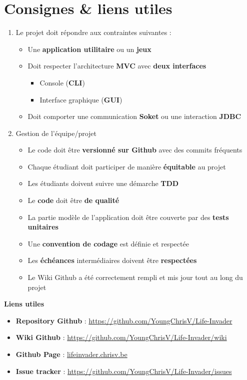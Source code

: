 \chapter*{Consignes \& liens utiles}
\label{chap:Consignes}

\begin{enumerate}[I]
    \item Le projet doit répondre aux contraintes suivantes :
    \begin{itemize}
        \item Une \textbf{application utilitaire} ou un \textbf{jeux}
        \item Doit respecter l'architecture \textbf{MVC} avec \textbf{deux interfaces}
        \begin{itemize}
            \item Console (\textbf{CLI})
            \item Interface graphique (\textbf{GUI})
        \end{itemize}
        \item Doit comporter une communication \textbf{Soket} ou une interaction \textbf{JDBC}
    \end{itemize}   
    \item Gestion de l'équipe/projet
    \begin{itemize}
        \item Le code doit être  \textbf{versionné sur Github} avec des commits fréquents
        \item Chaque étudiant doit participer de manière \textbf{équitable} au projet
        \item Les étudiants doivent suivre une démarche \textbf{TDD}
        \item Le \textbf{code} doit être \textbf{de qualité}
        \item La partie modèle de l'application doit être couverte par des \textbf{tests unitaires}
        \item Une \textbf{convention de codage} est définie et respectée
        \item Les \textbf{échéances} intermédiaires doivent être \textbf{respectées}
        \item Le Wiki Github a été correctement rempli et mis jour tout au long du projet
        \end{itemize}
\end{enumerate}

\textbf{Liens utiles}
\begin{itemize}
    \item \textbf{Repository Github} : \url{https://github.com/YoungChrisV/Life-Invader}
    \item \textbf{Wiki Github} : \url{https://github.com/YoungChrisV/Life-Invader/wiki}
    \item \textbf{Github Page} : \url{lifeinvader.chrisv.be}
    \item \textbf{Issue tracker} : \url{https://github.com/YoungChrisV/Life-Invader/issues}
\end{itemize}

\tableofcontents

\clearpage


